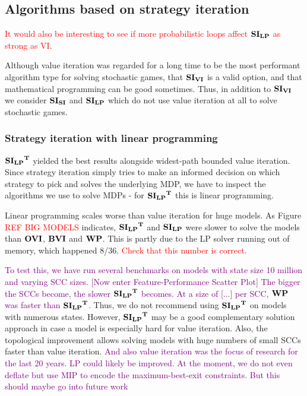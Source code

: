 \subsection{Algorithms based on strategy iteration}
\textcolor{red}{It would also be interesting to see if more probabilistic loops affect $\mathbf{SI_{LP}}$ as strong as VI}.

Although value iteration was regarded for a long time to be the most performant algorithm type for solving stochastic games, 
\cite{gandalf} that $\mathbf{SI_{VI}}$ is a valid option, and that mathematical programming can be good sometimes.
Thus, in addition to $\mathbf{SI_{VI}}$ we consider $\mathbf{SI_{SI}}$ and $\mathbf{SI_{LP}}$ which do not use value iteration at all to solve stochastic games.

\subsubsection*{Strategy iteration with linear programming}
$\mathbf{\mathbf{SI_{LP}}^T}$ yielded the best results alongside widest-path bounded value iteration.
Since strategy iteration simply tries to make an informed decision on which strategy to pick and solves the underlying MDP, 
we have to inspect the algorithms we use to solve MDPs - for $\mathbf{\mathbf{SI_{LP}}^T}$ this is linear programming.

Linear programming scales worse than value iteration for huge models.
As Figure \textcolor{red}{REF BIG MODELS} indicates, $\mathbf{\mathbf{SI_{LP}}^T}$ and $\mathbf{SI_{LP}}$ were slower to solve the models than $\mathbf{OVI}$, $\mathbf{BVI}$ and $\mathbf{WP}$.
This is partly due to the LP solver running out of memory, which happened 8/36. \textcolor{red}{Check that this number is correct.}

\textcolor{purple}{To test this, we have 
run several benchmarks on models with state size 10 million and varying SCC sizes. [Now enter Feature-Performance Scatter Plot] 
The bigger the SCCs become, the slower $\mathbf{\mathbf{SI_{LP}}^T}$ becomes. At a size of [...] per SCC, $\mathbf{WP}$ was faster than $\mathbf{\mathbf{SI_{LP}}^T}$.}
Thus, we do not recommend using $\mathbf{\mathbf{SI_{LP}}^T}$ on models with numerous states.
However, $\mathbf{\mathbf{SI_{LP}}^T}$ may be a good complementary solution approach in case a model is especially hard for value iteration.
Also, the topological improvement allows solving models with huge numbers of small SCCs faster than value iteration.
\textcolor{purple}{And also value iteration was the focus of research for the last 20 years. 
LP could likely be improved. At the moment, we do not even deflate but use MIP to encode the maximum-best-exit constraints. But this should maybe go into future work}

